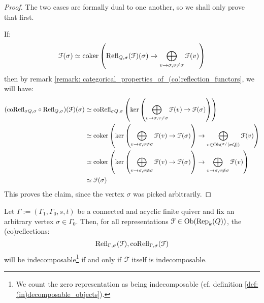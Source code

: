                 \begin{proof}
                    The two cases are formally dual to one another, so we shall only prove that first.
                    
                    If:
                        $$\mathcal{F}(\sigma) \simeq \operatorname{coker} \left( \mathrm{Refl}_{Q, \sigma}(\mathcal{F})(\sigma) \to \bigoplus_{v \to \sigma, v \not = \sigma} \mathcal{F}(v) \right)$$
                    then by remark \ref{remark: categorical_properties_of_(co)reflection_functors}, we will have:
                        $$
                            \begin{aligned}
                                (\mathrm{co}\mathrm{Refl}_{\sigma Q, \sigma} \circ \mathrm{Refl}_{Q, \sigma})(\mathcal{F})(\sigma) & \simeq \mathrm{co}\mathrm{Refl}_{\sigma Q, \sigma}\left( \ker \left( \bigoplus_{v \to \sigma, v \not = \sigma} \mathcal{F}(v) \to \mathcal{F}(\sigma) \right) \right)
                                \\
                                & \simeq \operatorname{coker} \left( \ker \left( \bigoplus_{v \to \sigma, v \not = \sigma} \mathcal{F}(v) \to \mathcal{F}(\sigma) \right) \to \bigoplus_{v \in \mathrm{Ob}({}^{\sigma/}[\sigma Q])} \mathcal{F}(v) \right)
                                \\
                                & \simeq \operatorname{coker} \left( \ker \left( \bigoplus_{v \to \sigma, v \not = \sigma} \mathcal{F}(v) \to \mathcal{F}(\sigma) \right) \to \bigoplus_{v \to \sigma, v \not = \sigma} \mathcal{F}(v) \right)
                                \\
                                & \simeq \mathcal{F}(\sigma)
                            \end{aligned}
                        $$
                    This proves the claim, since the vertex $\sigma$ was picked arbitrarily. 
                \end{proof}
            \begin{lemma} \label{lemma: (co)reflection_functors_preserve_indecomposability}
                Let $\Gamma := (\Gamma_1, \Gamma_0, s, t)$ be a connected and acyclic finite quiver and fix an arbitrary vertex $\sigma \in \Gamma_0$. Then, for all representations $\mathcal{F} \in \mathrm{Ob}(\mathrm{Rep}_k(Q))$, the (co)reflections:
                    $$\mathrm{Refl}_{\Gamma, \sigma}(\mathcal{F}), \mathrm{co}\mathrm{Refl}_{\Gamma, \sigma}(\mathcal{F})$$
                will be indecomposable\footnote{We count the zero representation as being indecomposable (cf. definition \ref{def: (in)decomposable_objects}).} if and only if $\mathcal{F}$ itself is indecomposable. 
            \end{lemma}
